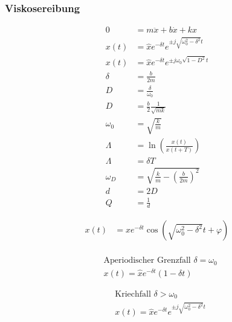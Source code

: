 \subsubsection*{Viskosereibung}
\begin{multicols}{2}{}
\begin{align*}
0&=m\ddot{x}+b\dot{x}+kx\\
x(t)&=\hat{x}e^{-\delta t}e^{\pm j\sqrt{\omega_0^2-\delta^2}t}\\
x(t)&=\hat{x}e^{-\delta t}e^{\pm j\omega_0\sqrt{1-D^2}t}\\
\delta&=\frac{b}{2m}\\
D&=\frac{\delta}{\omega_0}\\
D&=\frac{b}{2}\frac{1}{\sqrt{mk}}\\
\omega_0&=\sqrt{\frac{k}{m}}\\
\Lambda&=\ln\left(\frac{x(t)}{x(t+T)}\right)\\
\Lambda&=\delta T\\
\omega_D&=\sqrt{\frac{k}{m}-\left(\frac{b}{2m}\right)^2}\\
d&=2D\\
Q&=\frac{1}{d}
\end{align*}

{
\begin{align*}
x(t)&=\hat{x}e^{-\delta t}\cos(\sqrt{\omega_0^2-\delta^2}t+\varphi)\\
\end{align*}

\begin{align*}
&\text{Aperiodischer Grenzfall $\delta=\omega_0$}\\
&x(t)=\hat{x}e^{-\delta t}(1-\delta t)
\end{align*}

\begin{align*}
&\text{Kriechfall $\delta>\omega_0$}\\
&x(t)=\hat{x}e^{-\delta t}e^{\pm j\sqrt{\omega_0^2-\delta^2}t}
\end{align*}
}
\hfill

\end{multicols}